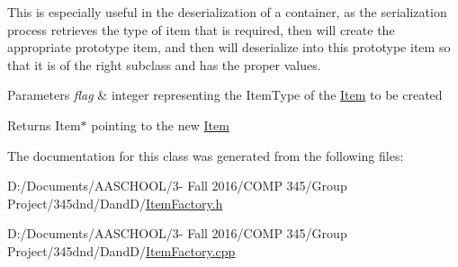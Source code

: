 This is especially useful in the deserialization of a container, as the serialization process retrieves the type of item that is required, then will create the appropriate prototype item, and then will deserialize into this prototype item so that it is of the right subclass and has the proper values. 
\begin{DoxyParams}{Parameters}
{\em flag} & integer representing the Item\+Type of the \hyperlink{class_item}{Item} to be created \\
\hline
\end{DoxyParams}
\begin{DoxyReturn}{Returns}
Item$\ast$ pointing to the new \hyperlink{class_item}{Item} 
\end{DoxyReturn}


The documentation for this class was generated from the following files\+:\begin{DoxyCompactItemize}
\item 
D\+:/\+Documents/\+A\+A\+S\+C\+H\+O\+O\+L/3-\/ Fall 2016/\+C\+O\+M\+P 345/\+Group Project/345dnd/\+Dand\+D/\hyperlink{_item_factory_8h}{Item\+Factory.\+h}\item 
D\+:/\+Documents/\+A\+A\+S\+C\+H\+O\+O\+L/3-\/ Fall 2016/\+C\+O\+M\+P 345/\+Group Project/345dnd/\+Dand\+D/\hyperlink{_item_factory_8cpp}{Item\+Factory.\+cpp}\end{DoxyCompactItemize}
